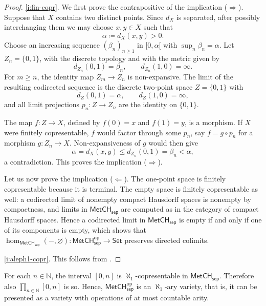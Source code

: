 \documentclass[11pt]{amsart}
\theoremstyle{definition}
\newcommand{\cat}[1]{\mathsf{#1}}
\newcommand{\op}{\mathrm{op}}
\newcommand{\MetCHsep}{\cat{MetCH_{sep}}}
\newcommand{\MetCHsepop}{\cat{MetCH}_\cat{sep}^\op}
\newcommand{\Set}{\cat{Set}}
\newcommand{\N}{\mathbb{N}}
\begin{document}
\begin{proof}
  \eqref{i:fin-copr}. We first prove the contrapositive of the implication ($\Rightarrow$). Suppose that \(X\) contains two distinct points. Since \(d_X\) is separated, after possibly interchanging them we may choose \(x,y\in X\) such that
  \[
    \alpha\coloneqq d_X(x,y)>0.
  \]
  Choose an increasing sequence \((\beta_n)_{n\geq 1}\) in \([0,\alpha[\) with \(\sup_n\beta_n=\alpha\). Let \(Z_n=\{0,1\}\), with the discrete topology and with the metric given by
  \[
    d_{Z_n}(0,1)=\beta_n,
    \qquad
    d_{Z_n}(1,0)=\infty.
  \]
  For \(m\geq n\), the identity map \(Z_m\to Z_n\) is non-expansive. The limit of the resulting codirected sequence is the discrete two-point space \(Z=\{0,1\}\) with
  \[
    d_Z(0,1)=\alpha,
    \qquad
    d_Z(1,0)=\infty,
  \]
  and all limit projections \(p_n\colon Z\to Z_n\) are the identity on $\{0,1\}$.

  The map \(f\colon Z\to X\), defined by \(f(0)=x\) and \(f(1)=y\), is a morphism. If \(X\) were finitely copresentable, \(f\) would factor through some \(p_n\), say \(f=g\circ p_n\) for a morphism \(g\colon Z_n\to X\). Non-expansiveness of \(g\) would then give
  \[
    \alpha=d_X(x,y)\leq d_{Z_n}(0,1)=\beta_n<\alpha,
  \]
  a contradiction. This proves the implication ($\Rightarrow$).

  Let us now prove the implication ($\Leftarrow$). The one-point space is finitely copresentable because it is terminal. The empty space is finitely copresentable as well: a codirected limit of nonempty compact Hausdorff spaces is nonempty by compactness, and limits in \(\MetCHsep\) are computed as in the category of compact Hausdorff spaces. Hence a codirected limit in \(\MetCHsep\) is empty if and only if one of its components is empty, which shows that \(\hom_{\MetCHsep}(-,\varnothing) \colon \MetCHsepop \to \Set\) preserves directed colimits.

  \eqref{i:aleph1-copr}. This follows from \cite[Corollary~4.38]{HN23}.
\end{proof}


\begin{corollary}
  For each \(n\in\N\), the interval \([0,n]\) is \(\aleph_1\)-copresentable in \(\MetCHsep\). Therefore also
  \begin{math}
    \prod_{n \in \N}[0,n]
  \end{math}
  is so. Hence, \(\MetCHsepop\) is an \(\aleph_1\)-ary variety, that is, it can be presented as a variety with operations of at most countable arity.
\end{corollary}
\end{document}
